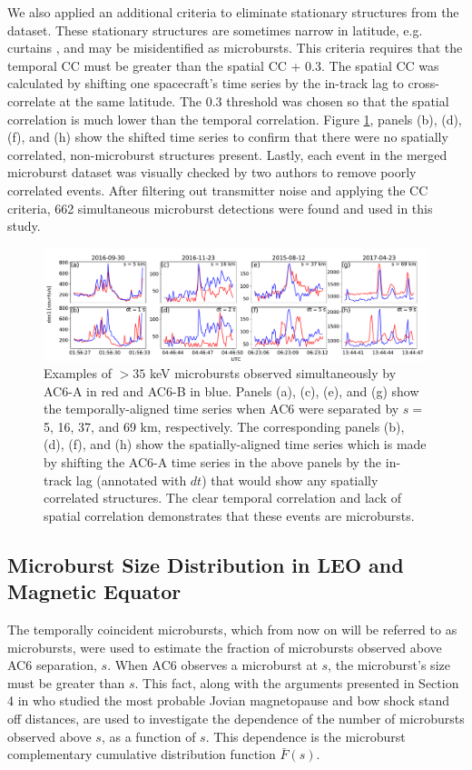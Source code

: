\documentclass[draft]{agujournal2019}
\begin{document}
We also applied an additional criteria to eliminate stationary structures from the dataset. These stationary structures are sometimes narrow in latitude, e.g. curtains \cite{Blake2016}, and may be misidentified as microbursts. This criteria requires that the temporal CC must be greater than the spatial CC + 0.3. The spatial CC was calculated by shifting one spacecraft's time series by the in-track lag to cross-correlate at the same latitude. The 0.3 threshold was chosen so that the spatial correlation is much lower than the temporal correlation. Figure \ref{fig2}, panels (b), (d), (f), and (h) show the shifted time series to confirm that there were no spatially correlated, non-microburst structures present. Lastly, each event in the merged microburst dataset was visually checked by two authors to remove poorly correlated events. After filtering out transmitter noise and applying the CC criteria, 662 simultaneous microburst detections were found and used in this study.

\begin{figure}
\includegraphics[width=\textwidth]{fig2.pdf}
\caption{Examples of $>35$ keV microbursts observed simultaneously by AC6-A in red and AC6-B in blue. Panels (a), (c), (e), and (g) show the temporally-aligned time series when AC6 were separated by $s=$ 5, 16, 37, and 69 km, respectively. The corresponding panels (b), (d), (f), and (h) show the spatially-aligned time series which is made by shifting the AC6-A time series in the above panels by the in-track lag (annotated with $dt$) that would show any spatially correlated structures. The clear temporal correlation and lack of spatial correlation demonstrates that these events are microbursts.} 
\label{fig2}
\end{figure}
	

\subsection{Microburst Size Distribution in LEO and Magnetic Equator}\label{microburst_distribution}
The temporally coincident microbursts, which from now on will be referred to as microbursts, were used to estimate the fraction of microbursts observed above AC6 separation, $s$. When AC6 observes a microburst at $s$, the microburst's size must be greater than $s$. This fact, along with the arguments presented in Section 4 in  who studied the most probable Jovian magnetopause and bow shock stand off distances, are used to investigate the dependence of the number of microbursts observed above $s$, as a function of $s$. This dependence is the microburst complementary cumulative distribution function $\bar{F}(s)$. 
\end{document}
